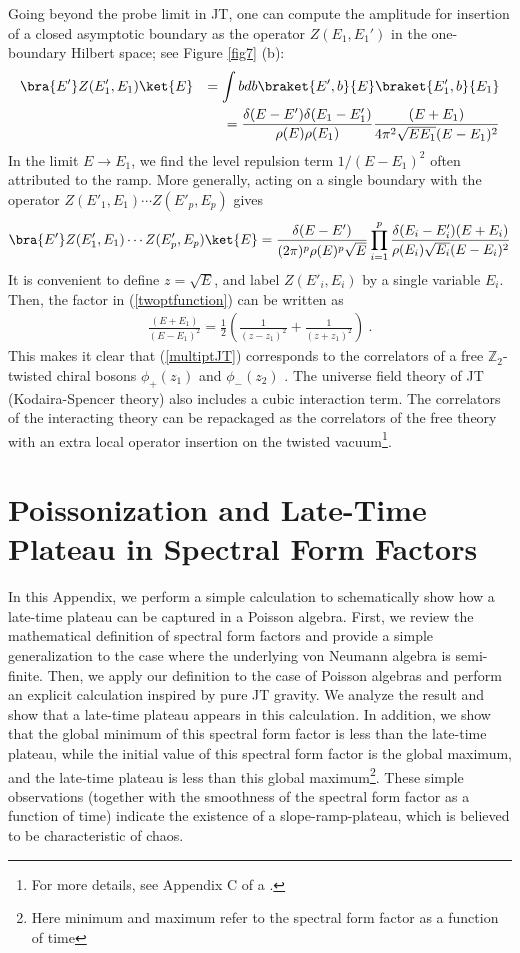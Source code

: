 \documentclass[a4paper,11pt]{article}
\theoremstyle{definition}
\numberwithin{equation}{section}
\newcommand{\lb}{\left(}
\newcommand{\rb}{\right)}
\newcommand{\nn}{\nonumber}
\begin{document}
 Going beyond the probe limit in JT, one can compute the amplitude for insertion of a closed asymptotic boundary as the operator $Z(E_1,E_1')$ in the one-boundary Hilbert space; see Figure \ref{fig7} (b):
 \begin{eqnarray}\label{twoptfunction}
     \bra{E'}Z(E'_1,E_1)\ket{E}&&=\int bdb\braket{E',b}{E}\braket{E_1',b}{E_1}\nn\\
     &&=\frac{\delta(E-E')\delta(E_1-E_1')}{\rho(E)\rho(E_1)}\frac{
     (E+E_1)
     }{4\pi^2\sqrt{EE_1}(E-E_1)^2}
 \end{eqnarray}
 In the limit $E\to E_1$, we find the level repulsion term $1/(E-E_1)^2$ often attributed to the ramp. More generally, acting on a single boundary with the operator $Z(E'_1,E_1)\cdots Z(E'_p,E_p)$ gives
\begin{eqnarray}\label{multiptJT}
    \bra{E'}Z(E'_1,E_1)\cdots Z(E'_p,E_p)\ket{E}=\frac{\delta(E-E')}{(2\pi)^{p}\rho(E)^p\sqrt{E}}\prod_{i=1}^p\frac{\delta(E_i-E'_i)(E+E_i)}{\rho(E_i)\sqrt{E_i}(E-E_i)^2}
\end{eqnarray}
It is convenient to define $z=\sqrt{E}$, and label $Z(E'_i,E_i)$ by a single variable $E_i$. Then, the factor in (\ref{twoptfunction}) can be written as
\begin{eqnarray}
    \frac{(E+E_1)}{(E-E_1)^2}=\frac{1}{2}\lb \frac{1}{(z-z_1)^2}+\frac{1}{(z+z_1)^2}\rb\ .
\end{eqnarray}
This makes it clear that (\ref{multiptJT}) corresponds to the correlators of a free $\mathbb{Z}_2$-twisted chiral bosons $\phi_+(z_1)$ and $\phi_-(z_2)$ \cite{post2022universe}. The universe field theory of JT (Kodaira-Spencer theory) also includes a cubic interaction term. The correlators of the interacting theory can be repackaged as the correlators of the free theory with an extra local operator insertion on the twisted vacuum\footnote{For more details, see Appendix C of a  \cite{post2022universe}.}. 


\section{Poissonization and Late-Time Plateau in Spectral Form Factors}\label{app:plateau}
In this Appendix, we perform a simple calculation to schematically show how a late-time plateau can be captured in a Poisson algebra. First, we review the mathematical definition of spectral form factors and provide a simple generalization to the case where the underlying von Neumann algebra is semi-finite. Then, we apply our definition to the case of Poisson algebras and perform an explicit calculation inspired by pure JT gravity. We analyze the result and show that a late-time plateau appears in this calculation. In addition, we show that the global minimum of this spectral form factor is less than the late-time plateau, while the initial value of this spectral form factor is the global maximum, and the late-time plateau is less than this global maximum\footnote{Here minimum and maximum refer to the spectral form factor as a function of time}. These simple observations (together with the smoothness of the spectral form factor as a function of time) indicate the existence of a slope-ramp-plateau, which is believed to be characteristic of chaos.
\end{document}
